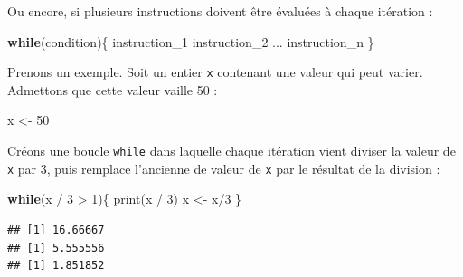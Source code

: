 \documentclass[
  11pt,
]{book}
\newenvironment{Shaded}{\begin{snugshade}}{\end{snugshade}}
\newcommand{\ControlFlowTok}[1]{\textcolor[rgb]{0.13,0.29,0.53}{\textbf{#1}}}
\newcommand{\DecValTok}[1]{\textcolor[rgb]{0.00,0.00,0.81}{#1}}
\newcommand{\FunctionTok}[1]{\textcolor[rgb]{0.00,0.00,0.00}{#1}}
\newcommand{\NormalTok}[1]{#1}
\newcommand{\OtherTok}[1]{\textcolor[rgb]{0.56,0.35,0.01}{#1}}
\newcommand{\SpecialCharTok}[1]{\textcolor[rgb]{0.00,0.00,0.00}{#1}}
\numberwithin{equation}{section}
\numberwithin{countremarque}{section}
\begin{document}
Ou encore, si plusieurs instructions doivent être évaluées à chaque itération :

\begin{Shaded}
\begin{Highlighting}[]
\ControlFlowTok{while}\NormalTok{(condition)\{}
\NormalTok{  instruction\_1}
\NormalTok{  instruction\_2}
\NormalTok{  ...}
\NormalTok{  instruction\_n}
\NormalTok{\}}
\end{Highlighting}
\end{Shaded}

Prenons un exemple. Soit un entier \texttt{x} contenant une valeur qui peut varier. Admettons que cette valeur vaille 50 :

\begin{Shaded}
\begin{Highlighting}[]
\NormalTok{x }\OtherTok{\textless{}{-}} \DecValTok{50}
\end{Highlighting}
\end{Shaded}

Créons une boucle \texttt{while} dans laquelle chaque itération vient diviser la valeur de \texttt{x} par 3, puis remplace l'ancienne de valeur de \texttt{x} par le résultat de la division :

\begin{Shaded}
\begin{Highlighting}[]
\ControlFlowTok{while}\NormalTok{(x }\SpecialCharTok{/} \DecValTok{3} \SpecialCharTok{\textgreater{}} \DecValTok{1}\NormalTok{)\{}
  \FunctionTok{print}\NormalTok{(x }\SpecialCharTok{/} \DecValTok{3}\NormalTok{)}
\NormalTok{  x }\OtherTok{\textless{}{-}}\NormalTok{ x}\SpecialCharTok{/}\DecValTok{3}
\NormalTok{\}}
\end{Highlighting}
\end{Shaded}

\begin{lstlisting}
## [1] 16.66667
## [1] 5.555556
## [1] 1.851852
\end{lstlisting}
\end{document}
